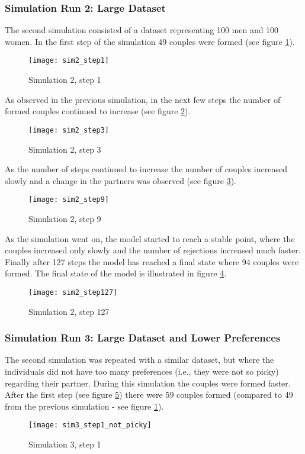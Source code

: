 \clearpage
\subsubsection{Simulation Run 2: Large Dataset}
The second simulation consisted of a dataset representing 100 men and 100 women. 
In the first step of the simulation 49 couples were formed (see figure \ref{fig:sim2_step1}).
\begin{figure}[H]
  \centering
  \texttt{[image: sim2\_step1]}
	\caption{Simulation 2, step 1}
	\label{fig:sim2_step1}
\end{figure}

As observed in the previous simulation, in the next few steps the number of formed couples continued to increase (see figure \ref{fig:sim2_step3}).
\begin{figure}[H]
  \centering
  \texttt{[image: sim2\_step3]}
	\caption{Simulation 2, step 3}
	\label{fig:sim2_step3}
\end{figure}

As the number of steps continued to increase the number of couples increased slowly and a change in the partners was observed (see figure \ref{fig:sim2_step9}).
\begin{figure}[H]
  \centering
  \texttt{[image: sim2\_step9]}
	\caption{Simulation 2, step 9}
	\label{fig:sim2_step9}
\end{figure}

As the simulation went on, the model started to reach a stable point, where the couples increased only slowly and the number of rejections increased much faster. 
Finally after 127 steps the model has reached a final state where 94 couples were formed.
The final state of the model is illustrated in figure \ref{fig:sim2_step127}.
\begin{figure}[H]
  \centering
  \texttt{[image: sim2\_step127]}
	\caption{Simulation 2, step 127}
	\label{fig:sim2_step127}
\end{figure}

\clearpage
\subsubsection{Simulation Run 3: Large Dataset and Lower Preferences}
The second simulation was repeated with a similar dataset, but where the individuals did not have too many preferences (i.e., they were not so picky) regarding their partner.
During this simulation the couples were formed faster. After the first step (see figure \ref{fig:sim3_step1_not_picky}) there were 59 couples formed (compared to 49 from the previous simulation - see figure \ref{fig:sim2_step1}).
\begin{figure}[H]
  \centering
  \texttt{[image: sim3\_step1\_not\_picky]}
	\caption{Simulation 3, step 1}
	\label{fig:sim3_step1_not_picky}
\end{figure}

